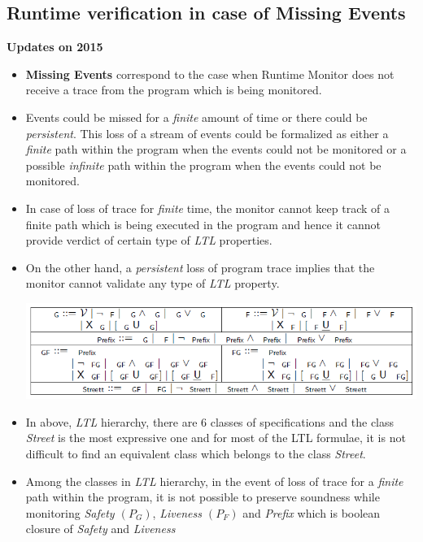 \documentclass[]{article}
\begin{document}
		\subsection{Runtime verification in case of Missing Events}
		\textbf{Updates on  {2015}}\newline
		\begin{itemize}
			
			\item \textbf{Missing Events} correspond to the case when Runtime Monitor does not receive a trace from the program which is being monitored.
			
			\item Events could be missed for a \emph{finite} amount of time or there could be \emph{persistent}. This loss of a stream of events could be formalized as either a \emph{finite} path within the program when the events could not be monitored or a possible \emph{infinite} path within the program when the events could not be monitored.
			
			\item In case of loss of trace for \emph{finite} time, the monitor cannot keep track of a finite path which is being executed in the program and hence it cannot provide verdict of certain type of \emph{LTL} properties.
			
			\item On the other hand, a \emph{persistent} loss of program trace implies that the monitor cannot validate any type of \emph{LTL} property.
			
			\includegraphics[scale=0.4]{LTLHierarchy.png}
			
			\item In above, \emph{LTL} hierarchy, there are 6 classes of specifications and the class \emph{Street} is the most expressive one and for most of the LTL formulae, it is not difficult to find an equivalent class which belongs to the class \emph{Street}.
			
			\item Among the classes in \emph{LTL} hierarchy, in the event of loss of trace for a \emph{finite} path within the program, it is not possible to preserve soundness while monitoring \emph{Safety $(P_G)$}, \emph{Liveness $(P_F)$} and \emph{Prefix} which is boolean closure of \emph{Safety} and \emph{Liveness}
			

\end{itemize}
\end{document}
